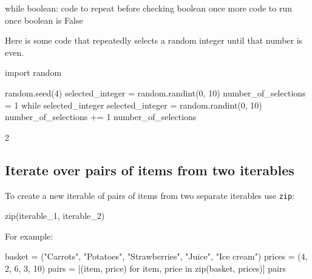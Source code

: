 \begin{api}
while boolean:
    code to repeat before checking boolean once more
code to run once boolean is False
\end{api}

Here is some code that repeatedly selects a random integer until that number is
even.


\begin{pyin}
import random

random.seed(4)
selected_integer = random.randint(0, 10)
number_of_selections = 1
while selected_integer %
    selected_integer = random.randint(0, 10)
    number_of_selections += 1
number_of_selections
\end{pyin}





\begin{raw}
2
\end{raw}





\subsection{Iterate over pairs of items from two iterables}
\label{\detokenize{building-tools/01-variables-conditionals-loops/how/main:iterate-over-pairs-of-items-from-two-iterables}}

To create a new iterable of pairs of items from two separate iterables use
\texttt{zip}:


\begin{api}
zip(iterable_1, iterable_2)
\end{api}



For example:




\begin{pyin}
basket = ("Carrots", "Potatoes", "Strawberries", "Juice", "Ice cream")
prices = (4, 2, 6, 3, 10)
pairs = [(item, price) for item, price in zip(basket, prices)]
pairs
\end{pyin}





\begin{raw}
\end{raw}





